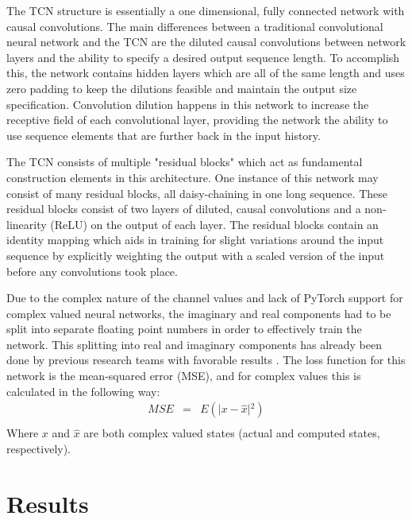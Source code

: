 \documentclass[twocolumn,letterpaper]{IEEEAerospaceCLS}  %
\begin{document}
The TCN structure is essentially a one dimensional, fully connected network with causal convolutions. The main differences between a traditional convolutional neural network and the TCN are the diluted causal convolutions between network layers and the ability to specify a desired output sequence length. To accomplish this, the network contains hidden layers which are all of the same length and uses zero padding to keep the dilutions feasible and maintain the output size specification. Convolution dilution happens in this network to increase the receptive field of each convolutional layer, providing the network the ability to use sequence elements that are further back in the input history. 



The TCN consists of multiple "residual blocks" which act as fundamental construction elements in this architecture. One instance of this network may consist of many residual blocks, all daisy-chaining in one long sequence. These residual blocks consist of two layers of diluted, causal convolutions and a non-linearity (ReLU) on the output of each layer. The residual blocks contain an identity mapping which aids in training for slight variations around the input sequence by explicitly weighting the output with a scaled version of the input before any convolutions took place. 

Due to the complex nature of the channel values and lack of PyTorch support for complex valued neural networks, the imaginary and real components had to be split into separate floating point numbers in order to effectively train the network. This splitting into real and imaginary components has already been done by previous research teams with favorable results \cite{tacspinar2010back}.  The loss function for this network is the mean-squared error (MSE), and for complex values this is calculated in the following way:
\begin{eqnarray*}
MSE&=&E(\lvert {x-\hat{x}}\rvert{^2}) \\
\end{eqnarray*}
Where $x$ and $\hat{x}$ are both complex valued states (actual and computed states, respectively). 


\section{Results}
\label{sec:results}
\end{document}
